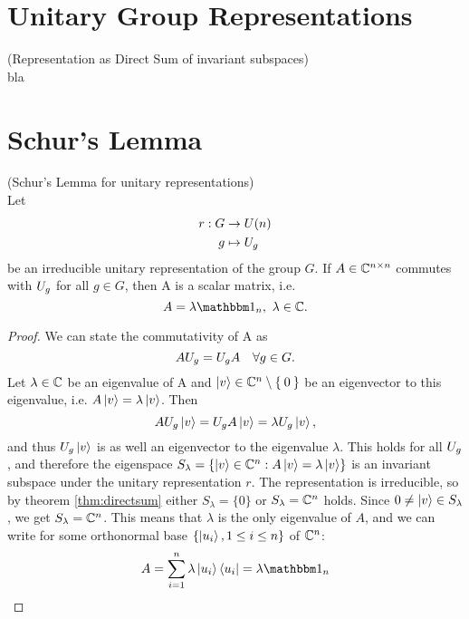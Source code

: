 \documentclass[a4paper,11pt, BCOR=4mm, DIV=12, pagesize]{scrartcl}
\begin{document}
\section{Unitary Group Representations}
\begin{thm}(Representation as Direct Sum of invariant 
subspaces)\label{thm:directsum}\\
 bla
\end{thm}

\section{Schur's Lemma}

\begin{thm}(Schur's Lemma for unitary representations)\\
 Let
 \begin{align*}
  r: G&\to U(n)\\
  g&\mapsto U_{g}
 \end{align*}
 be an irreducible unitary 
 representation of the group $G$. If $A\in\cmat{n}$ commutes with  $U_{g}$ 
 for all $g\in G$, then A is a scalar matrix, i.e. 
 \begin{equation*}
  A = \lambda \ind_n,\ \lambda\in\C.
 \end{equation*}
\end{thm}
\begin{proof}
 We can state the commutativity of A as 
 \begin{equation*}
  AU_{g} = U_{g}A\quad \forall g\in G.
 \end{equation*}
 Let $\lambda\in\mathbb{C}$ be an eigenvalue of A and $\ket{v}\in\mathbb{C}^n\setminus\Set{ 0 
}$ be  an eigenvector to this  eigenvalue, i.e. $A\ket{v} = \lambda\ket{v}$. 
Then 
 \begin{equation*}
  AU_{g}\ket{v} = U_{g}A\ket{v} = \lambda U_{g}\ket{v},
 \end{equation*}
 and thus $U_{g}\ket{v}$ is as well an eigenvector to the eigenvalue 
 $\lambda$. This holds for all $U_{g}$, and therefore the eigenspace 
 $S_\lambda = \left\{\ket{v}\in\mathbb{C}^n: A\ket{v} = \lambda\ket{v} \right\}$ is 
 an invariant subspace under the unitary representation $r$. The representation 
 is irreducible, so by theorem \ref{thm:directsum} either $S_\lambda = \{0\}$ 
 or $S_\lambda = \mathbb{C}^n$ holds. Since $0\neq\ket{v}\in S_\lambda$, we get 
$S_\lambda  = \mathbb{C}^n$. This means that $\lambda$ is the only eigenvalue of $A$, 
and we can  write for some orthonormal base $\left\{\ket{u_i}, 1\leq i\leq 
n\right\}$ of $\mathbb{C}^n$:
 \begin{equation*}
  A = \sum\limits_{i=1}^n \lambda \ket{u_i} \bra{u_i} = \lambda\ind_n
 \end{equation*}






\end{proof}
\end{document}
